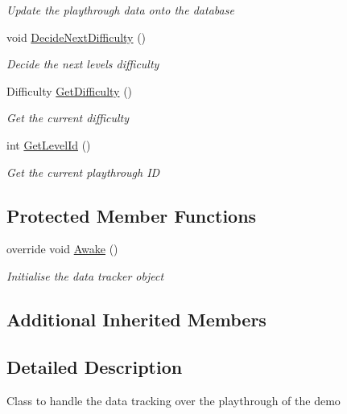 \begin{DoxyCompactItemize}
\begin{DoxyCompactList}\small\item\em Update the playthrough data onto the database \end{DoxyCompactList}\item 
void \mbox{\hyperlink{class_data_tracker_a7b834b9df13c46f7dfa9b51e87e1c6c0}{Decide\+Next\+Difficulty}} ()
\begin{DoxyCompactList}\small\item\em Decide the next level\textquotesingle{}s difficulty \end{DoxyCompactList}\item 
Difficulty \mbox{\hyperlink{class_data_tracker_aa31f9a357bd8db7116f0070b13f673d5}{Get\+Difficulty}} ()
\begin{DoxyCompactList}\small\item\em Get the current difficulty \end{DoxyCompactList}\item 
int \mbox{\hyperlink{class_data_tracker_ac408fabd7e0e96255508610fb66a18f2}{Get\+Level\+Id}} ()
\begin{DoxyCompactList}\small\item\em Get the current playthrough ID \end{DoxyCompactList}\end{DoxyCompactItemize}
\subsection*{Protected Member Functions}
\begin{DoxyCompactItemize}
\item 
override void \mbox{\hyperlink{class_data_tracker_a683df3af0a4675dc96498519641f6c53}{Awake}} ()
\begin{DoxyCompactList}\small\item\em Initialise the data tracker object \end{DoxyCompactList}\end{DoxyCompactItemize}
\subsection*{Additional Inherited Members}


\subsection{Detailed Description}
Class to handle the data tracking over the playthrough of the demo 



